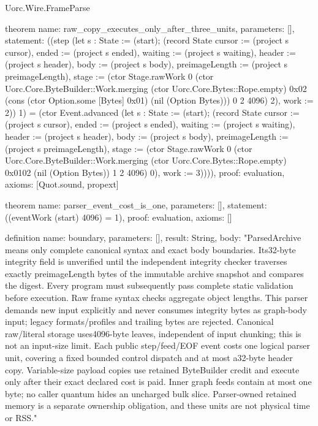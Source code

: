 \begin{lexlean}{Uorc.Wire.FrameParse}
\begin{semanticmodule}
theorem{
  name: raw_copy_executes_only_after_three_units,
  parameters: [],
  statement: ((step (let s : State := (start); (record State {cursor := (project s cursor), ended := (project s ended), waiting := (project s waiting), header := (project s header), body := (project s body), preimageLength := (project s preimageLength), stage := (ctor Stage.rawWork 0 (ctor Uorc.Core.ByteBuilder::Work.merging (ctor Uorc.Core.Bytes::Rope.empty) 0x02 (cons (ctor Option.some [Bytes] 0x01) (nil (Option Bytes))) 0 2 4096) 2), work := 2})) 1) = (ctor Event.advanced (let s : State := (start); (record State {cursor := (project s cursor), ended := (project s ended), waiting := (project s waiting), header := (project s header), body := (project s body), preimageLength := (project s preimageLength), stage := (ctor Stage.rawWork 0 (ctor Uorc.Core.ByteBuilder::Work.merging (ctor Uorc.Core.Bytes::Rope.empty) 0x0102 (nil (Option Bytes)) 1 2 4096) 0), work := 3})))),
  proof: evaluation{},
  axioms: [Quot.sound, propext]
}

theorem{
  name: parser_event_cost_is_one,
  parameters: [],
  statement: ((eventWork (start) 4096) = 1),
  proof: evaluation{},
  axioms: []
}

definition{
  name: boundary,
  parameters: [],
  result: String,
  body: "ParsedArchive means only complete canonical syntax and exact body boundaries. Its32-byte integrity field is unverified until the independent integrity checker traverses exactly preimageLength bytes of the immutable archive snapshot and compares the digest. Every program must subsequently pass complete static validation before execution. Raw frame syntax checks aggregate object lengths. This parser demands new input explicitly and never consumes integrity bytes as graph-body input; legacy formats/profiles and trailing bytes are rejected. Canonical raw/literal storage uses4096-byte leaves, independent of input chunking; this is not an input-size limit. Each public step/feed/EOF event costs one logical parser unit, covering a fixed bounded control dispatch and at most a32-byte header copy. Variable-size payload copies use retained ByteBuilder credit and execute only after their exact declared cost is paid. Inner graph feeds contain at most one byte; no caller quantum hides an uncharged bulk slice. Parser-owned retained memory is a separate ownership obligation, and these units are not physical time or RSS."
}
\end{semanticmodule}
\end{lexlean}
